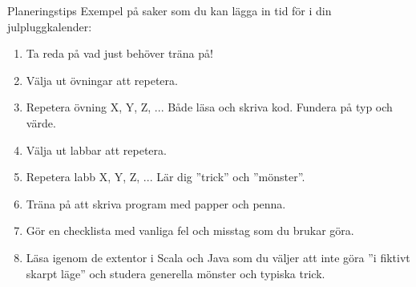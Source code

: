 \begin{Slide}{Planeringstips}\SlideFontTiny
Exempel på saker som du kan lägga in tid för i din julpluggkalender:
\begin{enumerate}
\item Ta reda på vad just  behöver träna på!
\item Välja ut övningar att repetera.
\item Repetera övning X, Y, Z, ... Både läsa och skriva kod. Fundera på typ och värde.
\item Välja ut labbar att repetera.
\item Repetera labb X, Y, Z, ... Lär dig ''trick'' och ''mönster''.
\item Träna på att skriva program med papper och penna.
\item Gör en checklista med vanliga fel och misstag som du brukar göra.

\item Läsa igenom de extentor i Scala och Java som du väljer att inte göra ''i fiktivt skarpt läge'' och studera generella mönster och typiska trick.
\end{enumerate}
\end{Slide}

